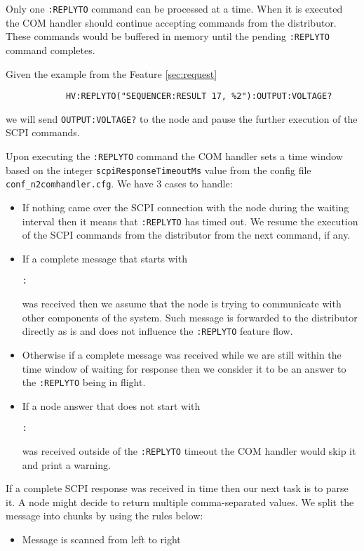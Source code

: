 \begin{itemize}
	\item Only one \texttt{:REPLYTO} command can be processed at a time. When it is executed the COM handler should continue accepting commands from the distributor. These commands would be buffered in memory until the pending \texttt{:REPLYTO} command completes.
	\item{
		Given the example from the Feature \ref{sec:request}
		\begin{verbatim}
			HV:REPLYTO("SEQUENCER:RESULT 17, %2"):OUTPUT:VOLTAGE?
		\end{verbatim}
		we will send \texttt{OUTPUT:VOLTAGE?} to the node and pause the further execution of the SCPI commands.
	}
	\item{
		Upon executing the \texttt{:REPLYTO} command the COM handler sets a time window based on the integer \texttt{scpiResponseTimeoutMs} value from the config file \texttt{conf\_n2comhandler.cfg}. We have 3 cases to handle:
		\begin{itemize}
			\item If nothing came over the SCPI connection with the node during the waiting interval then it means that \texttt{:REPLYTO} has timed out. We resume the execution of the SCPI commands from the distributor from the next command, if any.
			\item If a complete message that starts with \colorbox{selectioncolor}{\strut \texttt{:}} was received then we assume that the node is trying to communicate with other components of the system. Such message is forwarded to the distributor directly as is and does not influence the \texttt{:REPLYTO} feature flow.
			\item Otherwise if a complete message was received while we are still within the time window of waiting for response then we consider it to be an answer to the \texttt{:REPLYTO} being in flight.
			\item If a node answer that does not start with \colorbox{selectioncolor}{\strut \texttt{:}} was received outside of the \texttt{:REPLYTO} timeout the COM handler would skip it and print a warning.
		\end{itemize}
		\item{
			If a complete SCPI response was received in time then our next task is to parse it. A node might decide to return multiple comma-separated values. We split the message into chunks by using the rules below:
			\begin{itemize}
				\item Message is scanned from left to right

\end{itemize}}}
\end{itemize}
